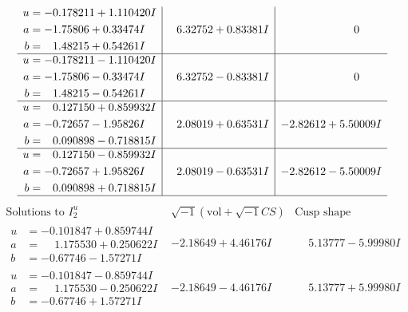 \documentclass[1p]{elsarticle_modified}
\theoremstyle{definition}
\newcommand{\I}{\sqrt{-1}}
\begin{document}
$$\begin{array}{c|c|c}
\begin{aligned}
u &= -0.178211 + 1.110420 I \\
a &= -1.75806 + 0.33474 I \\
b &= \phantom{-}1.48215 + 0.54261 I\end{aligned}
 & \phantom{-}6.32752 + 0.83381 I & \phantom{-0.000000 } 0 \\ \hline\begin{aligned}
u &= -0.178211 - 1.110420 I \\
a &= -1.75806 - 0.33474 I \\
b &= \phantom{-}1.48215 - 0.54261 I\end{aligned}
 & \phantom{-}6.32752 - 0.83381 I & \phantom{-0.000000 } 0 \\ \hline\begin{aligned}
u &= \phantom{-}0.127150 + 0.859932 I \\
a &= -0.72657 - 1.95826 I \\
b &= \phantom{-}0.090898 - 0.718815 I\end{aligned}
 & \phantom{-}2.08019 + 0.63531 I & -2.82612 + 5.50009 I \\ \hline\begin{aligned}
u &= \phantom{-}0.127150 - 0.859932 I \\
a &= -0.72657 + 1.95826 I \\
b &= \phantom{-}0.090898 + 0.718815 I\end{aligned}
 & \phantom{-}2.08019 - 0.63531 I & -2.82612 - 5.50009 I\\
 \hline 
 \end{array}$$\newpage$$\begin{array}{c|c|c}  
\text{Solutions to }I^u_{2}& \I (\text{vol} + \sqrt{-1}CS) & \text{Cusp shape}\\
 \hline 
\begin{aligned}
u &= -0.101847 + 0.859744 I \\
a &= \phantom{-}1.175530 + 0.250622 I \\
b &= -0.67746 - 1.57271 I\end{aligned}
 & -2.18649 + 4.46176 I & \phantom{-}5.13777 - 5.99980 I \\ \hline\begin{aligned}
u &= -0.101847 - 0.859744 I \\
a &= \phantom{-}1.175530 - 0.250622 I \\
b &= -0.67746 + 1.57271 I\end{aligned}
 & -2.18649 - 4.46176 I & \phantom{-}5.13777 + 5.99980 I \\ \hline\begin{aligned}

\end{aligned}
\end{array}$$
\end{document}
